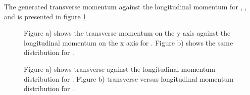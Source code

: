 The generated transverse momentum against the longitudinal momentum for \lam, \alam, \anticascade and \excitedcascade is 
presented in figure \ref{fig:MC_lambda0_pt_vs_pz}%


\begin{figure}
	\caption{\propose Figure a) shows the transverse momentum on the y axis against the longitudinal momentum on the x axis for \lam. Figure b) 
			shows the same distribution for \alam.}
	\label{fig:MC_lambda0_pt_vs_pz}
\end{figure}


\begin{figure}
	\caption{\propose Figure a) shows transverse against the longitudinal momentum distribution for \anticascade. Figure b) 
			transverse versus longitudinal momentum distribution for \excitedcascade.}
	\label{fig:MC_xi_pt_vs_pz}
\end{figure}

